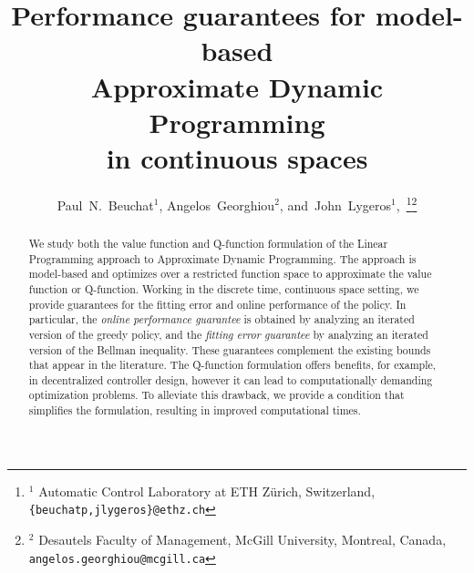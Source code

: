 \documentclass[journal]{IEEEtran}
\begin{document}
\toggletrue{doublecolumn}



\title{
Performance guarantees for model-based\\Approximate Dynamic Programming\\in continuous spaces
}





\author{Paul~N.~Beuchat$^1$,
	Angelos~Georghiou$^2$,
	and~John~Lygeros$^1$,~\thanks{
$^1$ Automatic Control Laboratory at ETH Z\"{u}rich, Switzerland, {\tt\footnotesize \{beuchatp,jlygeros\}@ethz.ch}}\thanks{
$^2$ Desautels Faculty of Management, McGill University, Montreal,
	Canada, {\tt\footnotesize angelos.georghiou@mcgill.ca}}}






















\maketitle






\begin{abstract}
We study both the value function and Q-function formulation of the Linear Programming  approach to Approximate Dynamic Programming. The approach is model-based and optimizes over a restricted function space to approximate the value function or Q-function.
Working in the discrete time, continuous space setting, we provide guarantees for the fitting error and online performance of the policy.
In particular, the \emph{online performance guarantee} is obtained by analyzing an iterated version of the greedy policy, and
the \emph{fitting error guarantee} by analyzing an iterated version of the Bellman inequality.
These guarantees complement the existing bounds that appear in the literature.
The Q-function formulation offers benefits, for example, in decentralized controller design, however it can lead to computationally demanding optimization problems.
To alleviate this drawback, we provide a condition that simplifies the formulation, resulting in improved computational times.
\end{abstract} 
\end{document}
